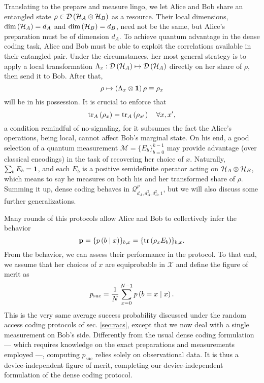         Translating to the prepare and measure lingo, we let Alice and Bob share an entangled state $\rho \in \mathcal{D}\left( \mathcal{H}_A \otimes \mathcal{H}_B \right)$ as a resource. Their local dimensions, $\text{dim} \left( \mathcal{H}_A \right) = d_A$ and $\text{dim} \left( \mathcal{H}_B \right) = d_B$, need not be the same, but Alice's preparation must be of dimension $d_A$. To achieve quantum advantage in the dense coding task, Alice and Bob must be able to exploit the correlations available in their entangled pair. Under the circumstances, her most general strategy is to apply a local transformation $\Lambda_x : \mathcal{D}\left( \mathcal{H}_A \right) \mapsto \mathcal{D}\left( \mathcal{H}_A \right)$ directly on her share of $\rho$, then send it to Bob. After that,
        $$
            \rho \mapsto \left( \Lambda_x \otimes \mathbf{1} \right)\rho \equiv \rho_x
        $$
        will be in his possession. It is crucial to enforce that
        $$
            \text{tr}_{A}\left( \rho_x \right) = \text{tr}_{A}\left( \rho_{x^\prime} \right) \quad\forall x, x^\prime ,
        $$
        a condition remindful of no-signaling, for it subsumes the fact the Alice's operations, being local, cannot affect Bob's marginal state. On his end, a good selection of a quantum measurement $\mathcal{M} = \{ E_b \}_{b=0}^{k-1}$ may provide advantage (over classical encodings) in the task of recovering her choice of $x$. Naturally, $\sum_b E_b = \mathbf{1}$, and each $E_b$ is a positive semidefinite operator acting on $\mathcal{H}_A \otimes \mathcal{H}_B$, which means to say he measures on both his and her transformed share of $\rho$. Summing it up, dense coding behaves in $\mathcal{Q}^\rho_{d_A,d_A^2,d_A^2,1}$, but we will also discuss some further generalizations.
        
        Many rounds of this protocols allow Alice and Bob to collectively infer the behavior
        $$
            \mathbf{p} = \{ p \left( b \mid x \right) \}_{b,x} = \{ \text{tr}\left( \rho_x E_b  \right) \}_{b,x} .
        $$
        From the behavior, we can assess their performance in the protocol. To that end, we assume that her choices of $x$ are equiprobable in $\mathcal{X}$ and define the figure of merit as
        \begin{equation}
            p_{\text{suc}} = \frac{1}{N} \sum_{x=0}^{N-1} p \left( b=x \mid x \right) .
            \label{eq:psuc-dense-coding}
        \end{equation}
        This is the very same average success probability discussed under the random access coding protocols of sec. \ref{sec:racs}, except that we now deal with a single measurement on Bob's side. Differently from the usual dense coding formulation --- which requires knowledge on the exact preparations and measurements employed ---, computing $p_{\text{suc}}$ relies solely on observational data. It is thus a device-independent figure of merit, completing our device-independent formulation of the dense coding protocol.
        
